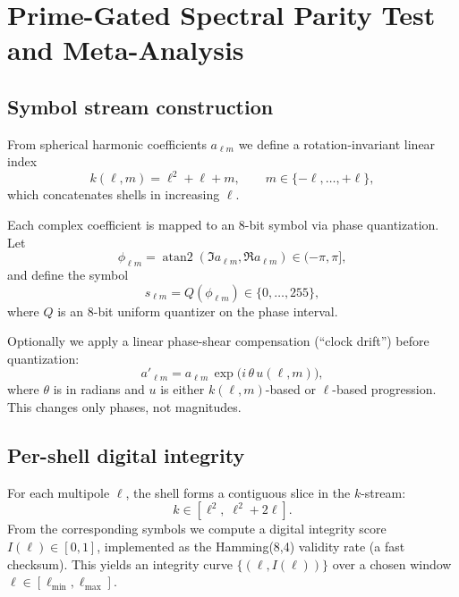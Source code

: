 
\section{Prime-Gated Spectral Parity Test and Meta-Analysis}

\subsection{Symbol stream construction}
From spherical harmonic coefficients $a_{\ell m}$ we define a rotation-invariant
linear index
\begin{equation}
k(\ell,m)=\ell^2+\ell+m, \qquad m\in\{-\ell,\dots,+\ell\},
\end{equation}
which concatenates shells in increasing $\ell$.

Each complex coefficient is mapped to an 8-bit symbol via phase quantization.
Let
\begin{equation}
\phi_{\ell m}=\operatorname{atan2}(\Im a_{\ell m}, \Re a_{\ell m}) \in (-\pi,\pi],
\end{equation}
and define the symbol
\begin{equation}
s_{\ell m} = Q(\phi_{\ell m}) \in \{0,\dots,255\},
\end{equation}
where $Q$ is an 8-bit uniform quantizer on the phase interval.

Optionally we apply a linear phase-shear compensation (``clock drift'') before
quantization:
\begin{equation}
a'_{\ell m} = a_{\ell m}\,\exp\bigl(i\,\theta\,u(\ell,m)\bigr),
\end{equation}
where $\theta$ is in radians and $u$ is either $k(\ell,m)$-based or $\ell$-based
progression. This changes only phases, not magnitudes.

\subsection{Per-shell digital integrity}
For each multipole $\ell$, the shell forms a contiguous slice in the $k$-stream:
\begin{equation}
k \in [\ell^2,\; \ell^2+2\ell].
\end{equation}
From the corresponding symbols we compute a digital integrity score
$I(\ell)\in[0,1]$, implemented as the Hamming(8,4) validity rate (a fast checksum).
This yields an integrity curve $\{(\ell, I(\ell))\}$ over a chosen window
$\ell\in[\ell_{\min},\ell_{\max}]$.

